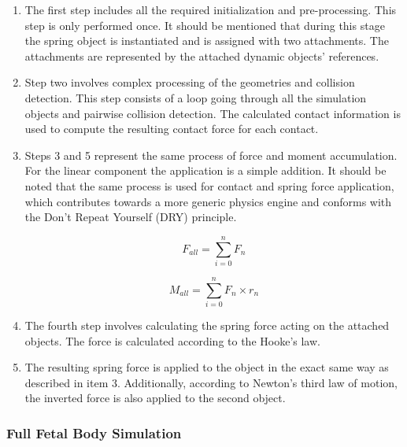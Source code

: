 \begin{enumerate}

  \item The first step includes all the required initialization and pre-processing. This step is only performed once. It should be mentioned that during this stage the spring object is instantiated and is assigned with two attachments. The attachments are represented by the attached dynamic objects’ references.

  \item Step two involves complex processing of the geometries and collision detection. This step consists of a loop going through all the simulation objects and pairwise collision detection. The calculated contact information is used to compute the resulting contact force for each contact.

  \item Steps 3 and 5 represent the same process of force and moment accumulation. For the linear component the application is a simple addition. It should be noted that the same process is used for contact and spring force application, which contributes towards a more generic physics engine and conforms with the Don’t Repeat Yourself (DRY) principle.

  \begin{equation}
  \label{eq-force-sum}
  F_{all} = \sum_{i=0}^{n}F_{n}
  \end{equation}

  \begin{equation}
  \label{eq-moments-sum}
  M_{all} = \sum_{i=0}^{n}F_{n} \times  r_{n}
  \end{equation}


  \item The fourth step involves calculating the spring force acting on the attached objects. The force is calculated according to the Hooke’s law.

  \item The resulting spring force is applied to the object in the exact same way as described in item 3. Additionally, according to Newton’s third law of motion, the inverted force is also applied to the second object.

\end{enumerate}


\subsubsection{Full Fetal Body Simulation}

